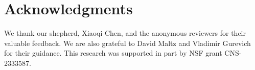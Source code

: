 \documentclass[letterpaper,twocolumn,10pt]{article}
\begin{document}












\section*{Acknowledgments}

We thank our shepherd, Xiaoqi Chen, and the anonymous reviewers for their valuable feedback. We are also grateful to David Maltz and Vladimir Gurevich for their guidance. This research was supported in part by NSF grant CNS-2333587.





\clearpage


\end{document}
